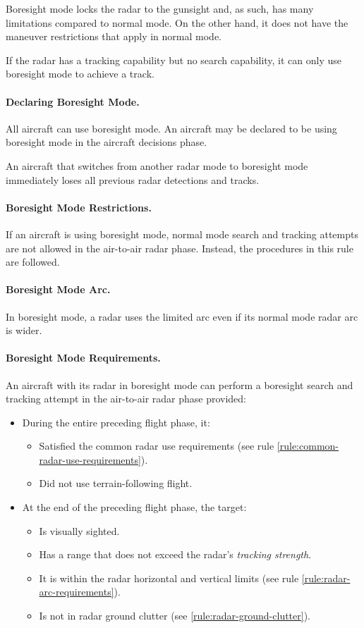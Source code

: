 {\begin{advancedrules}
Boresight mode locks the radar to the gunsight and, as such, has many limitations compared to normal  mode. On the other hand, it does not have the maneuver restrictions that apply in normal mode.

If the radar has a tracking capability but no search capability, it can only use boresight mode to achieve a track. 

\paragraph{Declaring Boresight Mode.} All aircraft can use boresight mode. An aircraft may be declared to be using boresight mode in the aircraft decisions phase. 

An aircraft that switches from another radar mode to boresight mode immediately loses all previous radar detections and tracks. 

\paragraph{Boresight Mode Restrictions.}
If an aircraft is using boresight mode, normal mode search and tracking attempts are not allowed in the air-to-air radar phase. Instead, the procedures in this rule are followed.

\paragraph{Boresight Mode Arc.} 
In boresight mode, a radar uses the limited arc even if its normal mode radar arc is wider.

\paragraph{Boresight Mode Requirements.} 
An aircraft with its radar in boresight mode can perform a boresight search and tracking attempt in the air-to-air radar phase provided:

\begin{itemize}

\item During the entire preceding flight phase, it:
    \begin{itemize}
    \item Satisfied the common radar use requirements (see rule \ref{rule:common-radar-use-requirements}).
    \item Did not use terrain-following flight.
    \end{itemize}
\item At the end of the preceding flight phase, the target:
\begin{itemize}
    \item Is visually sighted.
    \item Has a range that does not exceed the radar's \emph{tracking strength}. 
    \item It is within the radar horizontal and vertical limits (see rule \ref{rule:radar-arc-requirements}).
    \item Is not in radar ground clutter (see  \ref{rule:radar-ground-clutter}).
\end{itemize}


\end{itemize}
\end{advancedrules}}
